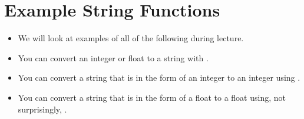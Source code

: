 \documentclass[letterpaper,10pt,english]{sphinxmanual}
\begin{document}
\section{Example String Functions}
\label{\detokenize{lecture_notes/lec03_strings:example-string-functions}}\begin{itemize}
\item {} 
We will look at examples of all of the following during lecture.

\item {} 
You can convert an integer or float to a string with .

\item {} 
You can convert a string that is in the form of an integer to an
integer using .

\item {} 
You can convert a string that is in the form of a float to a float
using, not surprisingly, .

\end{itemize}
\end{document}
